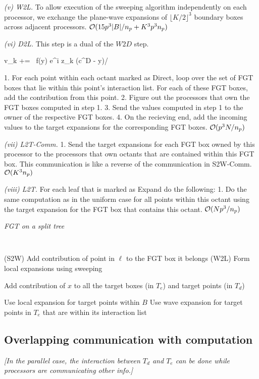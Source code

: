 {\em (v) W2L.} To allow execution of the sweeping algorithm independently on each processor, we exchange the plane-wave expansions of $\lfloor K/2 \rfloor ^3$ boundary boxes across adjacent processors. 
\hfill $\mathcal{O}(15 p^3 |B|/n_p + K^3 p^3 n_p)$

{\em (vi) D2L.} This step is a dual of the $W2D$ step. 

\beq v_k += \, f(y) e^{i z_k \cdot (c^D - y)/\sqrt{\delta}} \eeq

1. For each point within each octant marked as Direct, loop over the set 
of FGT boxes that lie within this point's interaction list. For each of
these FGT boxes, add the contribution from this point.
2. Figure out the processors that own the FGT boxes computed in step 1.
3. Send the values computed in step 1 to the owner of the respective FGT
boxes.
4. On the recieving end, add the incoming values to the target
expansions for the corresponding FGT boxes. 
\hfill $\mathcal{O}(p^3 N / n_p)$

{\em (vii) L2T-Comm.} 
1. Send the target expansions for each FGT box owned by this processor
to the processors that own octants that are contained within this FGT
box. This communication is like a reverse of the communication in
S2W-Comm.  
\hfill $\mathcal{O}(K^3 n_p)$

{\em (viii) L2T.} 
For each leaf that is marked as Expand do the following:
  1. Do the same computation as in the uniform case for
  all points within this octant using the target expansion for the
  FGT box that contains this octant. 
\hfill $\mathcal{O}(N p^3/n_p)$

\begin{algorithm}[!h]
\caption{\em FGT on a split tree}
{\tt
\begin{algorithmic}
\STATE
      \STATE (S2W) Add contribution of point in $\ell$ to the FGT box it belongs
  \ENDFOR
  \STATE
  \STATE (W2L) Form local expansions using sweeping
  \STATE 

          \STATE Add contribution of $x$ to all the target boxes (in $T_e$) and target points (in $T_d$)     
       \ENDFOR  
  \ENDFOR
  
  \STATE 
        \STATE Use local expansion for target points within $B$ 
        \STATE
        \STATE Use wave expansion for target points in $T_e$ that are within its interaction list
     \ENDFOR  
\STATE
\end{algorithmic}
}
\end{algorithm}

\subsection{Overlapping communication with computation} 

{\em [In the parallel case, the interaction between $T_d$ and $T_e$ can be done while processors are communicating other info.] }

